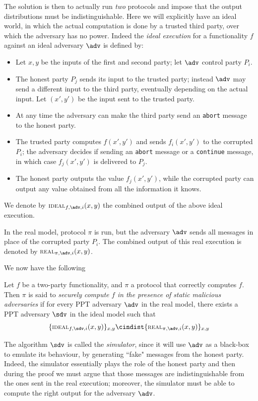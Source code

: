 The solution is then to actually run \emph{two} protocols and impose that the output distributions must be indistinguishable. Here we will explicitly have an ideal world, in which the actual computation is done by a trusted third party, over which the adversary has no power. Indeed the \emph{ideal execution} for a functionality $f$ against an ideal adversary $\adv$ is defined by:
\begin{itemize}
    \item Let $x,y$ be the inputs of the first and second party; let $\adv$ control party $P_i$.
    \item The honest party $P_j$ sends its input to the trusted party; instead $\adv$ may send a different input to the third party, eventually depending on the actual input. Let $(x',y')$ be the input sent to the trusted party.
    \item At any time the adversary can make the third party send an \texttt{abort} message to the honest party.
    \item The trusted party computes $f(x',y')$ and sends $f_i(x',y')$ to the corrupted $P_i$; the adversary decides if sending an \texttt{abort} message or a \texttt{continue} message, in which case $f_j(x',y')$ is delivered to $P_j$.
    \item The honest party outputs the value $f_j(x',y')$, while the corrupted party can output any value obtained from all the information it knows.
\end{itemize}

We denote by $\textsc{\scriptsize IDEAL}_{f,\adv,i}(x,y)$ the combined output of the above ideal execution.

In the real model, protocol $\pi$ is run, but the adversary $\adv$ sends all messages in place of the corrupted party $P_i$. The combined output of this real execution is denoted by $\textsc{\scriptsize REAL}_{\pi,\adv,i}(x,y)$.

We now have the following
\begin{definition}
    Let $f$ be a two-party functionality, and $\pi$ a protocol that correctly computes $f$. Then $\pi$ is said to \emph{securely compute $f$ in the presence of static malicious adversaries} if for every PPT adversary $\adv$ in the real model, there exists a PPT adversary $\sdv$ in the ideal model such that
    $$ \{ \textsc{\scriptsize IDEAL}_{f,\sdv,i}(x,y) \}_{x,y} \cindist \{ \textsc{\scriptsize REAL}_{\pi,\adv,i}(x,y) \}_{x,y}$$
\end{definition}

The algorithm $\sdv$ is called the \emph{simulator}, since it will use $\adv$ as a black-box to emulate its behaviour, by generating ``fake" messages from the honest party. Indeed, the simulator essentially plays the role of the honest party and then during the proof we must argue that those messages are indistinguishable from the ones sent in the real execution; moreover, the simulator must be able to compute the right output for the adversary $\adv$.

